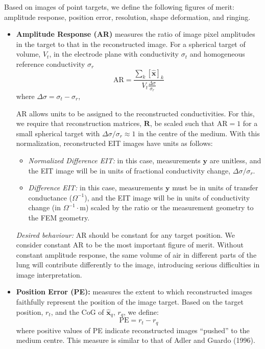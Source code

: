 \documentclass[12pt]{iopart}
\newcommand{\xH}{\mbox{$\mathbf{\hat x}$}}
\newcommand{\yB}{\mbox{$\mathbf{y}$}}
\newcommand{\RB}{\mbox{$\mathbf{R}$}}
\begin{document}
Based on images of point targets, we define the following
figures of merit:
amplitude response,
position error,
resolution,
shape deformation, and
ringing. 

\begin{itemize}

\item
{\bf Amplitude Response (AR)}
measures the ratio of image pixel amplitudes in the
target to that in the reconstructed image.
For a spherical target of volume, $V_t$, in the electrode
plane with
conductivity $\sigma_t$ and homogeneous reference
conductivity $\sigma_r$
\begin{equation}
\mathrm{AR} =  \frac{
    \sum_k [\xH]_k
  }{
    V_t \frac{\Delta\sigma}{\sigma_r}
  }
\end{equation}
where $\Delta\sigma = \sigma_t - \sigma_r$,

AR allows units to be assigned to the 
reconstructed conductivities. For this, we 
require that reconstruction matrices, $\RB$, be
scaled such that AR$=1$ for 
a small spherical target with
 $\Delta\sigma/\sigma_r \approx 1$
in the centre of the medium.
With this normalization, reconstructed EIT images have
units as follows:
   \begin{itemize}
   \item {\em Normalized Difference EIT:}
in this case, measurements $\yB$ are unitless,
and the EIT image will be in units of fractional conductivity
change, $\Delta\sigma/\sigma_r$.
   \item {\em Difference EIT:}
in this case, measurements $\yB$ must be in units of
transfer conductance ($\Omega^{-1}$), and the EIT image
will be in units of conductivity change (in $\Omega^{-1}\cdot$m)
scaled by the ratio or the measurement geometry to
the FEM geometry.
   \end{itemize}


\hspace{5mm}
{\em Desired behaviour:}
AR should be constant for any target position. We consider
constant
AR to be the most important figure of merit. Without
constant amplitude response, the same volume of air in different parts
of the lung will contribute differently to the image, introducing
serious difficulties in image interpretation.

\item
{\bf Position Error (PE):}
measures the extent to which reconstructed images faithfully
represent the position of the image target. Based on the
target position, $r_t$, and the CoG of $\xH_q$, $r_q$, we define:
\begin{equation}
\mathrm{PE} = r_t - r_q
\end{equation}
where positive values of PE indicate reconstructed images
``pushed'' to the medium centre. This measure is similar
to that of Adler and Guardo (1996).


\end{itemize}
\end{document}
